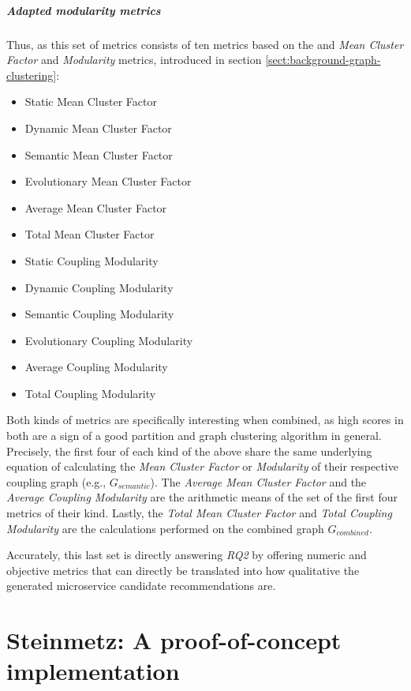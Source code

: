 \documentclass[12pt,a4paper]{report}
\begin{document}
\paragraph{Adapted modularity metrics}
Thus, as this set of metrics consists of ten metrics based on the and
\textit{Mean Cluster Factor} and \textit{Modularity} metrics,
introduced in section \ref{sect:background-graph-clustering}:
\begin{itemize}[noitemsep]
  \item Static Mean Cluster Factor
  \item Dynamic Mean Cluster Factor
  \item Semantic Mean Cluster Factor
  \item Evolutionary Mean Cluster Factor
  \item Average Mean Cluster Factor
  \item Total Mean Cluster Factor
  \item Static Coupling Modularity
  \item Dynamic Coupling Modularity
  \item Semantic Coupling Modularity
  \item Evolutionary Coupling Modularity
  \item Average Coupling Modularity
  \item Total Coupling Modularity
\end{itemize}
Both kinds of metrics are specifically
interesting when combined, as high scores in both are a sign of a good
partition and graph clustering algorithm in general. Precisely, the first four
of each kind of the above share the same underlying equation of calculating the
\textit{Mean Cluster Factor} or \textit{Modularity} of their respective
coupling graph (e.g., \(G_{semantic}\)). The \textit{Average Mean Cluster
Factor} and the \textit{Average Coupling Modularity} are the arithmetic means
of the set of the first four metrics of their kind. Lastly, the \textit{Total
Mean Cluster Factor} and \textit{Total Coupling Modularity} are the
calculations performed on the combined graph \(G_{combined}\).

Accurately, this last set is directly answering \textit{RQ2} by offering
numeric and objective metrics that can directly be translated into how
qualitative the generated microservice candidate recommendations are.




\chapter{Steinmetz: A proof-of-concept implementation} \label{chap:implementation}
\end{document}
